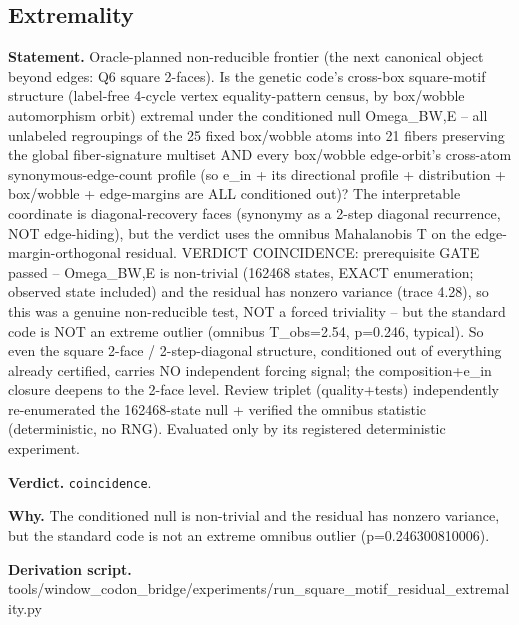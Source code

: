 \subsection{Extremality}\label{sec:bridge-extremality}
\textbf{Statement.} Oracle-planned non-reducible frontier (the next canonical object beyond edges: Q6 square 2-faces).
Is the genetic code's cross-box square-motif structure (label-free 4-cycle vertex equality-pattern
census, by box/wobble automorphism orbit) extremal under the conditioned null Omega\_BW,E -- all
unlabeled regroupings of the 25 fixed box/wobble atoms into 21 fibers preserving the global
fiber-signature multiset AND every box/wobble edge-orbit's cross-atom synonymous-edge-count profile
(so e\_in + its directional profile + distribution + box/wobble + edge-margins are ALL conditioned
out)? The interpretable coordinate is diagonal-recovery faces (synonymy as a 2-step diagonal
recurrence, NOT edge-hiding), but the verdict uses the omnibus Mahalanobis T on the
edge-margin-orthogonal residual. VERDICT COINCIDENCE: prerequisite GATE passed -- Omega\_BW,E is
non-trivial (162468 states, EXACT enumeration; observed state included) and the residual has nonzero
variance (trace 4.28), so this was a genuine non-reducible test, NOT a forced triviality -- but the
standard code is NOT an extreme outlier (omnibus T\_obs=2.54, p=0.246, typical). So even the square
2-face / 2-step-diagonal structure, conditioned out of everything already certified, carries NO
independent forcing signal; the composition+e\_in closure deepens to the 2-face level. Review
triplet (quality+tests) independently re-enumerated the 162468-state null + verified the omnibus
statistic (deterministic, no RNG). Evaluated only by its registered deterministic experiment.

\textbf{Verdict.} \texttt{coincidence}.

\textbf{Why.} The conditioned null is non-trivial and the residual has nonzero variance, but the standard code is
not an extreme omnibus outlier (p=0.246300810006).

\textbf{Derivation script.} tools/window\_codon\_bridge/experiments/run\_square\_motif\_residual\_extremality.py

